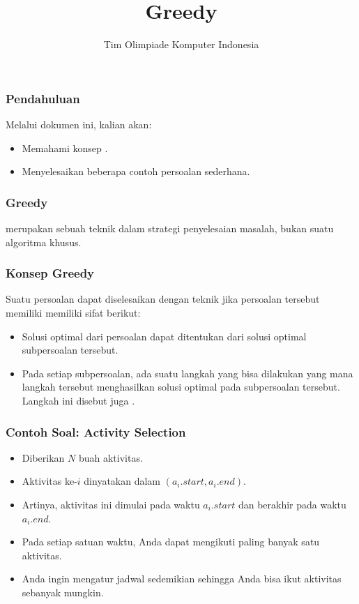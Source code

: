  

\title{Greedy}
\author{Tim Olimpiade Komputer Indonesia}
\date{}



\begin{frame}
  \titlepage
\end{frame}

\begin{frame}
  \frametitle{Pendahuluan}
  Melalui dokumen ini, kalian akan:
  \begin{itemize}
    \item Memahami konsep \fgreedy.
    \item Menyelesaikan beberapa contoh persoalan \fgreedy sederhana.
  \end{itemize}
\end{frame}

\begin{frame}
  \frametitle{Greedy}
  \begin{center}
    \newTerm{\fGreedy} merupakan sebuah teknik dalam strategi penyelesaian masalah, bukan suatu algoritma khusus.
  \end{center}
\end{frame}

\begin{frame}
  \frametitle{Konsep Greedy}
  Suatu persoalan dapat diselesaikan dengan teknik \fgreedy jika persoalan tersebut memiliki memiliki sifat berikut:
  \begin{itemize}
    \item Solusi optimal dari persoalan dapat ditentukan dari solusi optimal subpersoalan tersebut.
    \item Pada setiap subpersoalan, ada suatu langkah yang bisa dilakukan yang mana langkah tersebut menghasilkan solusi optimal pada subpersoalan tersebut. Langkah ini disebut juga \newTerm{\fgreedyChoice}.
  \end{itemize}
\end{frame}

\begin{frame}
  \frametitle{Contoh Soal: Activity Selection}
  \begin{itemize}
    \item Diberikan $N$ buah aktivitas.
    \item Aktivitas ke-$i$ dinyatakan dalam $(a_i.start, a_i.end)$.
    \item Artinya, aktivitas ini dimulai pada waktu $a_i.start$ dan berakhir pada waktu $a_i.end$.
    \item Pada setiap satuan waktu, Anda dapat mengikuti paling banyak satu aktivitas.
    \item Anda ingin mengatur jadwal sedemikian sehingga Anda bisa ikut aktivitas sebanyak mungkin.
  \end{itemize}
\end{frame}

